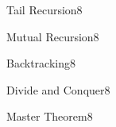 \documentclass[a4paper]{article}
\begin{document}
\header


\begin{problem}{Tail Recursion}{8}
\end{problem}

\begin{problem}{Mutual Recursion}{8}
\end{problem}

\begin{problem}{Backtracking}{8}
\end{problem}

\begin{problem}{Divide and Conquer}{8}
\end{problem}

\begin{problem}{Master Theorem}{8}
\end{problem}
\end{document}

